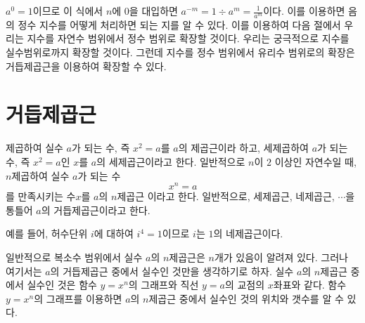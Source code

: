 \documentclass[11pt, a4paper]{book}
\begin{document}
$a^{0}=1$이므로 이 식에서 $n$에 $0$을 대입하면 $a^{-m}=1 \div a^m = \frac{1}{a^m}$이다. 이를 이용하면 음의 정수 지수를 어떻게 처리하면 되는 지를 알 수 있다. 이를 이용하여 다음 절에서 우리는 지수를 자연수 범위에서 정수 범위로 확장할 것이다. 우리는 궁극적으로 지수를 실수범위로까지 확장할 것이다. 그런데 지수를 정수 범위에서 유리수 범위로의 확장은 거듭제곱근을 이용하여 확장할 수 있다.
  
 	\section{거듭제곱근}
제곱하여 실수 $a$가 되는 수, 즉 $x^2 =a$를 $a$의 제곱근이라 하고, 세제곱하여 $a$가 되는 수, 즉  $x^2 =a$인 $x$를 $a$의 세제곱근이라고 한다. 일반적으로 $n$이 $2$ 이상인 자연수일 때, $n$제곱하여 실수 $a$가 되는 수
$$x^n =a$$
를 만족시키는 수$x$를 $a$의 {\color{red}$n$제곱근} 이라고 한다. 일반적으로, 세제곱근, 네제곱근, $\cdots$을 통틀어 $a$의 {\color{red}거듭제곱근}이라고 한다.

예를 들어, 허수단위 $i$에 대하여 $i^4 =1$이므로 $i$는 $1$의 네제곱근이다.

 일반적으로 복소수 범위에서 실수 $a$의 $n$제곱근은 $n$개가 있음이 알려져 있다. 그러나 여기서는 $a$의 거듭제곱근 중에서 실수인 것만을 생각하기로 하자. 실수 $a$의 $n$제곱근 중에서 실수인 것은 함수 $y = x^n$의 그래프와 직선 $y=a$의 교점의 $x$좌표와 같다. 함수 $y = x^n$의 그래프를 이용하면 $a$의 $n$제곱근 중에서 실수인 것의 위치와 갯수를 알 수 있다.
 
\end{document}
